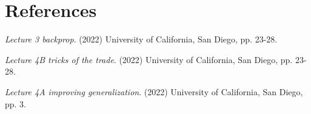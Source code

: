 \section*{References}

\medskip


{
	\small


	\begin{enumerate}[label={[\arabic*]}]
		\item \textit{Lecture 3 backprop}. (2022) University of California, San Diego, pp. 23-28. \\
		\item \textit{Lecture 4B tricks of the trade}. (2022) University of California, San Diego, pp. 23-28. \\
		\item \textit{Lecture 4A improving generalization}. (2022) University of California, San Diego, pp. 3.
	\end{enumerate}
}
